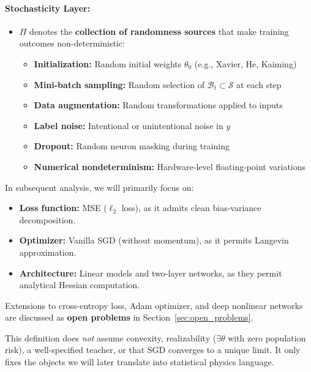 \documentclass[
  journal=largetwo,
  simfonts=false,
  year=2025,
  volume=37,
]{cup-journal}
\begin{document}
\begin{setting}
\paragraph{Stochasticity Layer:}
\begin{itemize}
    \item $\Pi$ denotes the \textbf{collection of randomness sources} that make training outcomes non-deterministic:
    \begin{itemize}
        \item \textbf{Initialization:} Random initial weights $\theta_0$ (e.g., Xavier, He, Kaiming)
        \item \textbf{Mini-batch sampling:} Random selection of $\mathcal{B}_t \subset \mathcal{S}$ at each step
        \item \textbf{Data augmentation:} Random transformations applied to inputs
        \item \textbf{Label noise:} Intentional or unintentional noise in $y$
        \item \textbf{Dropout:} Random neuron masking during training
        \item \textbf{Numerical nondeterminism:} Hardware-level floating-point variations
    \end{itemize}
\end{itemize}
\end{setting}

\begin{remark}
In subsequent analysis, we will primarily focus on:
\begin{itemize}
    \item \textbf{Loss function:} MSE ($\ell_2$ loss), as it admits clean bias-variance decomposition.
    \item \textbf{Optimizer:} Vanilla SGD (without momentum), as it permits Langevin approximation.
    \item \textbf{Architecture:} Linear models and two-layer networks, as they permit analytical Hessian computation.
\end{itemize}
Extensions to cross-entropy loss, Adam optimizer, and deep nonlinear networks are discussed as \textbf{open problems} in Section~\ref{sec:open_problems}.
\end{remark}

\begin{remark}
This definition does \emph{not} assume convexity, realizability ($\exists\theta$ with zero population risk), a well-specified teacher, or that SGD converges to a unique limit. It only fixes the objects we will later translate into statistical physics language.
\end{remark}
\end{document}

